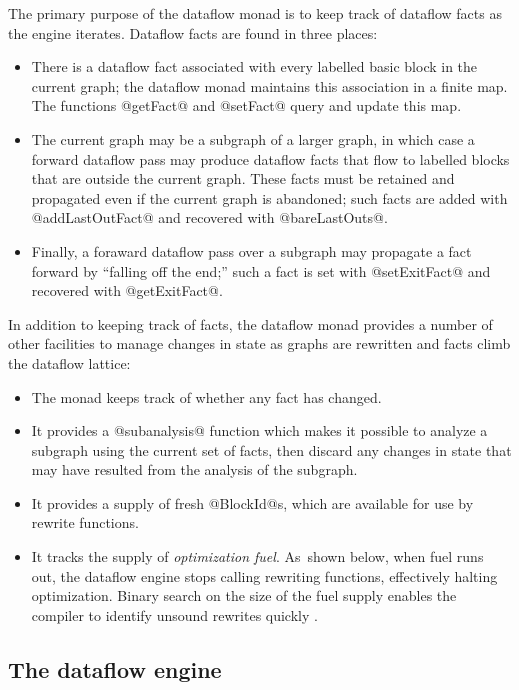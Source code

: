 \documentclass[blockstyle,preprint,nocopyrightspace]{sigplanconf}
\let\cite\citep
\begin{document}
The primary purpose of the dataflow monad is to keep track of 
dataflow facts as the engine iterates.
Dataflow facts are found in three places:
\begin{itemize}
\item
There is a dataflow fact associated with every labelled basic block in
the current graph;
the dataflow monad maintains this association in a finite map.
The functions @getFact@ and @setFact@ query and update this map.
\item
The current graph may be a subgraph of a larger graph, in which case a
forward dataflow pass may produce dataflow facts that flow to labelled
blocks that are outside the current graph.
These facts must be retained and propagated even if the current graph
is abandoned; such facts are added with @addLastOutFact@ and recovered
with @bareLastOuts@.
\item
Finally, a foraward dataflow pass over a subgraph may propagate a fact forward by
``falling off the end;'' such a fact is set with @setExitFact@ and
recovered with @getExitFact@.
\end{itemize}
In addition to keeping track of facts, 
the dataflow monad provides a number of other facilities to manage
changes in state as graphs are rewritten and facts climb the dataflow
lattice:
\begin{itemize}
\item
The monad keeps track of whether any fact has changed.
\item
It provides a @subanalysis@ function which makes it possible to
 analyze a subgraph using the current set of facts, then discard any
 changes in state that may have resulted from the analysis of the
 subgraph.
\item
It provides a supply of fresh @BlockId@s, which are available for use
by rewrite functions.
\item
It tracks the supply of \emph{optimization fuel}.
As~shown below, when fuel runs out, the dataflow engine stops
calling rewriting functions, effectively halting optimization.
Binary search on the size of the fuel supply enables the compiler to
identify unsound rewrites quickly \cite{whalley:isolation}.
\end{itemize}


\subsection{The dataflow engine}
\end{document}
